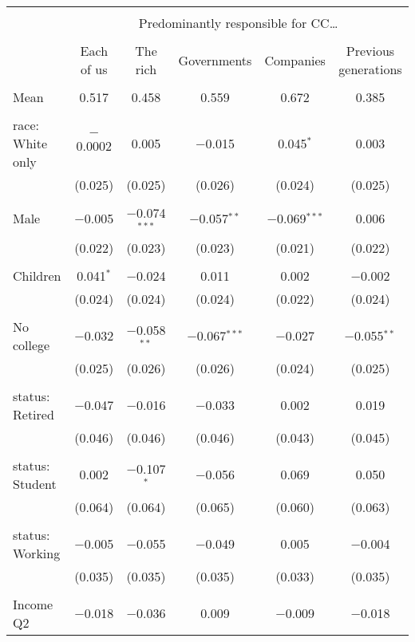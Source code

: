 
\begin{tabular}{@{\extracolsep{5pt}}lccccc} 
\\[-1.8ex]\hline 
\hline \\[-1.8ex] 
 & \multicolumn{5}{c}{Predominantly responsible for CC…} \\ 
\cline{2-6} 
\\[-1.8ex] & Each of us & The rich & Governments & Companies & Previous generations \\ 
\hline \\[-1.8ex] 
 Mean & 0.517 & 0.458 & 0.559 & 0.672 & 0.385  \\ \hline \\[-1.8ex] race: White only & $-$0.0002 & 0.005 & $-$0.015 & 0.045$^{*}$ & 0.003 \\ 
  & (0.025) & (0.025) & (0.026) & (0.024) & (0.025) \\ 
  & & & & & \\ 
 Male & $-$0.005 & $-$0.074$^{***}$ & $-$0.057$^{**}$ & $-$0.069$^{***}$ & 0.006 \\ 
  & (0.022) & (0.023) & (0.023) & (0.021) & (0.022) \\ 
  & & & & & \\ 
 Children & 0.041$^{*}$ & $-$0.024 & 0.011 & 0.002 & $-$0.002 \\ 
  & (0.024) & (0.024) & (0.024) & (0.022) & (0.024) \\ 
  & & & & & \\ 
 No college & $-$0.032 & $-$0.058$^{**}$ & $-$0.067$^{***}$ & $-$0.027 & $-$0.055$^{**}$ \\ 
  & (0.025) & (0.026) & (0.026) & (0.024) & (0.025) \\ 
  & & & & & \\ 
 status: Retired & $-$0.047 & $-$0.016 & $-$0.033 & 0.002 & 0.019 \\ 
  & (0.046) & (0.046) & (0.046) & (0.043) & (0.045) \\ 
  & & & & & \\ 
 status: Student & 0.002 & $-$0.107$^{*}$ & $-$0.056 & 0.069 & 0.050 \\ 
  & (0.064) & (0.064) & (0.065) & (0.060) & (0.063) \\ 
  & & & & & \\ 
 status: Working & $-$0.005 & $-$0.055 & $-$0.049 & 0.005 & $-$0.004 \\ 
  & (0.035) & (0.035) & (0.035) & (0.033) & (0.035) \\ 
  & & & & & \\ 
 Income Q2 & $-$0.018 & $-$0.036 & 0.009 & $-$0.009 & $-$0.018 \\ 

\end{tabular}
